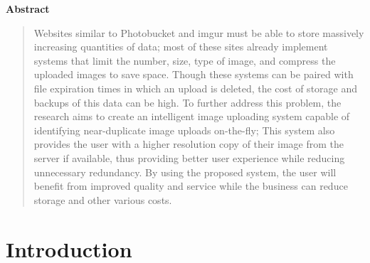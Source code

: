 \documentclass[11pt]{article}
\begin{document}
\begin{center}
\large\bf Abstract
\vspace{-1em}  %
\end{center}


\begin{quote}
Websites similar to Photobucket and imgur must be able to store massively increasing quantities of data; most of these sites already implement systems that limit the number, size, type of image, and compress the uploaded images to save space. Though these systems can be paired with file expiration times in which an upload is deleted, the cost of storage and backups of this data can be high. To further address this problem, the research aims to create an intelligent image uploading system capable of identifying near-duplicate image uploads on-the-fly; This system also provides the user with a higher resolution copy of their image from the server if available, thus providing better user experience while reducing unnecessary redundancy. By using the proposed system, the user will benefit from improved quality and service while the business can reduce storage and other various costs.
\end{quote}

\section{Introduction}
\label{sec:introduction}
\vspace*{-.1in}

\end{document}
